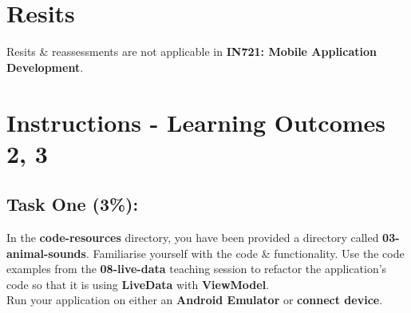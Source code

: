 \documentclass{article}
\begin{document}
\section*{Resits}
Resits \& reassessments are not applicable in \textbf{IN721: Mobile Application Development}.

\section*{Instructions - Learning Outcomes 2, 3}
\subsection*{Task One (3\%):}
In the \textbf{code-resources} directory, you have been provided a directory called \textbf{03-animal-sounds}. Familiarise yourself with the code \& functionality. Use the code examples from the \textbf{08-live-data} teaching session to refactor the application's code so that it is using \textbf{LiveData} with \textbf{ViewModel}. \\

Run your application on either an \textbf{Android Emulator} or \textbf{connect device}. \\ 
\end{document}
